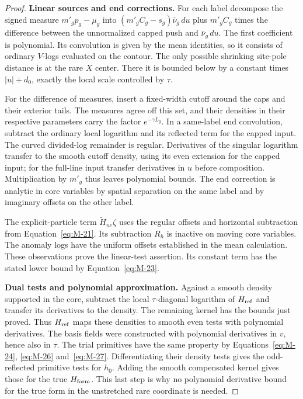 \begin{proof}
\par\smallskip\noindent\textbf{Linear sources and end corrections.}
For each label decompose the signed measure $m'_gp_g-\mu_g$ into
$(m'_gC_g-s_g)\bar\nu_g\,du$ plus $m'_gC_g$ times the difference
between the unnormalized capped push and $\bar\nu_g\,du$.
The first coefficient is polynomial. Its convolution is given by
the mean identities, so it consists of ordinary $V$-logs evaluated
on the contour. The only possible shrinking site-pole distance is
at the rare $X$ center. There it is bounded below by a constant times
$|u|+d_0$, exactly the local scale controlled by $\tau$.

For the difference of measures, insert a fixed-width cutoff around
the caps and their exterior tails. The measures agree off this set,
and their densities in their respective parameters carry the factor
$e^{-\gamma L_g}$. In a same-label end convolution, subtract the
ordinary local logarithm and its reflected term for the capped input.
The curved divided-log remainder is regular. Derivatives of the
singular logarithm transfer to the smooth cutoff density, using its
even extension for the capped input; for the full-line input transfer
derivatives in $u$ before composition. Multiplication by $m'_g$ thus
leaves polynomial bounds. The end correction is analytic in core
variables by spatial separation on the same label and by imaginary
offsets on the other label.

The explicit-particle term $\widetilde H_{ne}\zeta$ uses the regular
offsets and horizontal subtraction from Equation~\eqref{eq:M-21}.
Its subtraction $R_h$ is inactive on moving core variables. The anomaly
logs have the uniform offsets established in the mean calculation.
These observations prove the linear-test assertion. Its constant
term has the stated lower bound by Equation~\eqref{eq:M-23}.

\par\smallskip\noindent\textbf{Dual tests and polynomial approximation.}
Against a smooth density supported in the core, subtract the local
$\tau$-diagonal logarithm of $H_{\rm ref}$ and transfer its derivatives
to the density. The remaining kernel has the bounds just proved.
Thus $H_{\rm ref}$ maps these densities to smooth even tests with
polynomial derivatives. The basis fields were constructed with
polynomial derivatives in $v$, hence also in $\tau$. The trial
primitives have the same property by Equations~\eqref{eq:M-24},
\eqref{eq:M-26} and~\eqref{eq:M-27}. Differentiating their density
tests gives the odd-reflected primitive tests for $h_0$. Adding the
smooth compensated kernel gives those for the true $H_{\rm form}$.
This last step is why no polynomial derivative bound for the true
form in the unstretched rare coordinate is needed.


\end{proof}
